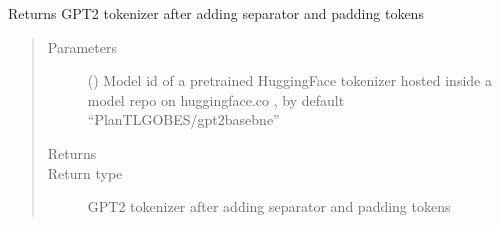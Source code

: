 \documentclass[letterpaper,10pt,english]{sphinxmanual}
\begin{document}
\begin{fulllineitems}
\label{\detokenize{code:utils.add_special_tokens}}
\sphinxAtStartPar
Returns GPT2 tokenizer after adding separator and padding tokens
\begin{quote}\begin{description}
\item[{Parameters}] \leavevmode
\sphinxAtStartPar
{} (\sphinxstyleliteralemphasis{\sphinxupquote{, }}) \textendash{} Model id of a pretrained HuggingFace tokenizer hosted inside a model repo on
huggingface.co , by default “PlanTL\sphinxhyphen{}GOB\sphinxhyphen{}ES/gpt2\sphinxhyphen{}base\sphinxhyphen{}bne”

\item[{Returns}] \leavevmode
\sphinxAtStartPar


\item[{Return type}] \leavevmode
\sphinxAtStartPar
GPT2 tokenizer after adding separator and padding tokens

\end{description}\end{quote}

\end{fulllineitems}

\end{document}
